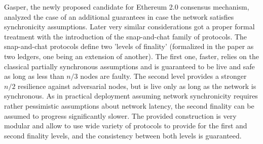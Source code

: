 \documentclass[12pt, fleqn]{article}
\begin{document}
Gasper\cite{BHKPQRSWZ18}, the newly proposed candidate for Ethereum 2.0 consensus mechanism, analyzed the case of an additional guarantees in case the network satisfies synchronicity assumptions. Later very similar considerations got a proper formal treatment with the introduction of the snap-and-chat family of protocols\cite{NNT20}.
The snap-and-chat protocols define two 'levels of finality' (formalized in the paper as two ledgers, one being an extension of another). The first one, faster, relies on the classical partially synchronous assumptions and is guaranteed to be live and safe as long as less than $n/3$ nodes are faulty. 
The second level provides a stronger $n/2$ resilience against adversarial nodes, but is live only as long as the network is synchronous.
As in practical deployment assuming network synchronicity requires rather pessimistic assumptions about network latency, the second finality can be assumed to progress significantly slower. 
The provided construction is very modular and allow to use wide variety of protocols to provide for the first and second finality levels, and the consistency between both levels is guaranteed.
\end{document}

